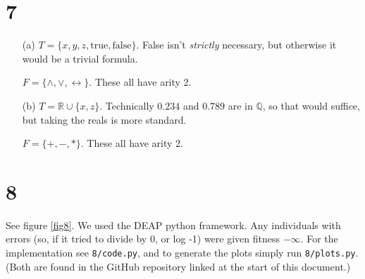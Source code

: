 \documentclass{scrartcl}
\begin{document}
\section*{7}
\begin{itemize}
  \item[(a)]
    $T = \{x, y, z, \text{true}, \text{false}\}$. False isn't
    \emph{strictly} necessary, but otherwise it would be a trivial
    formula.

    $F = \{\land, \lor, \leftrightarrow\}$. These all have arity 2.

  \item[(b)]
    $T = \mathbb{R} \cup \{x, z\}$. Technically $0.234$ and $0.789$ are in
    $\mathbb{Q}$, so that would suffice, but taking the reals is more
    standard.

    $F = \{+, -, *\}$. These all have arity 2.

\end{itemize}

\section*{8}
See figure \ref{fig8}. We used the DEAP python framework. Any individuals with
errors (so, if it tried to divide by 0, or log -1) were given fitness
$-\infty$. For the implementation see \texttt{8/code.py}, and to generate
the plots simply run \texttt{8/plots.py}. (Both are found in the GitHub repository
linked at the start of this document.)
\end{document}
